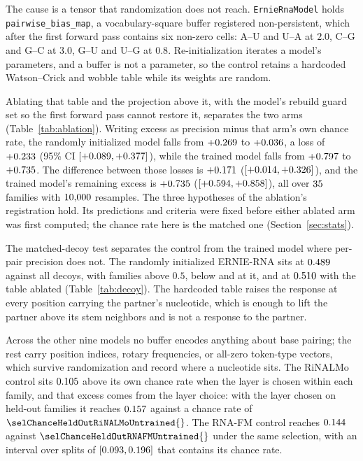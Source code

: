 \documentclass[11pt]{article}
\begin{document}
The cause is a tensor that randomization does not reach.
\texttt{ErnieRnaModel} holds \texttt{pairwise\_bias\_map}, a
vocabulary-square buffer registered non-persistent, which after the first
forward pass contains six non-zero cells: A--U and U--A at $2.0$, C--G and G--C
at $3.0$, G--U and U--G at $0.8$. Re-initialization iterates a model's
parameters, and a buffer is not a parameter, so the control retains a hardcoded
Watson--Crick and wobble table while its weights are random.



Ablating that table and the projection above it, with the model's rebuild guard
set so the first forward pass cannot restore it, separates the two arms
(Table~\ref{tab:ablation}).
Writing excess as precision minus that arm's own
chance rate, the randomly initialized model falls from
$+0.269{}$ to $+0.036{}$, a
loss of $+0.233{}$ (95\% CI $[+0.089, +0.377]{}$), while the
trained model falls from $+0.797{}$ to
$+0.735{}$. The difference between those losses is
$+0.171{}$ ($[+0.014, +0.326]{}$), and the trained
model's remaining excess is $+0.735{}$
($[+0.594, +0.858]{}$), all over $35{}$ families with
$10{,}000{}$ resamples. The three hypotheses of the ablation's registration
hold. Its predictions and criteria were fixed before either ablated arm was
first computed; the chance rate here is the matched one
(Section~\ref{sec:stats}).

The matched-decoy test separates the control from the trained model where
per-pair precision does not. The randomly initialized ERNIE-RNA sits at
$0.489{}$ against all decoys, with
\decoyAllAboveErnieRNAUntrained{} families above $0.5$,
\decoyAllBelowErnieRNAUntrained{} below and \decoyAllAtHalfErnieRNAUntrained{}
at it, and at $0.510{}$ with the table ablated
(Table~\ref{tab:decoy}). The hardcoded table raises the response at every
position carrying the partner's nucleotide, which is enough to lift the partner
above its stem neighbors and is not a response to the partner.

Across the other nine models no buffer encodes anything about base pairing;
the rest carry position indices, rotary frequencies, or all-zero token-type
vectors, which survive randomization and record where a nucleotide sits. The
RiNALMo control sits $0.105{}$ above its own chance rate
when the layer is chosen within each family, and that excess comes from the
layer choice: with the layer chosen on held-out families it reaches
$0.157{}$ against a chance rate of
$\selChanceHeldOutRiNALMoUntrained{}$. The RNA-FM control reaches
$0.144{}$ against $\selChanceHeldOutRNAFMUntrained{}$
under the same selection, with an interval over splits of
$[0.093, 0.196]{}$ that contains its chance rate.
\end{document}
